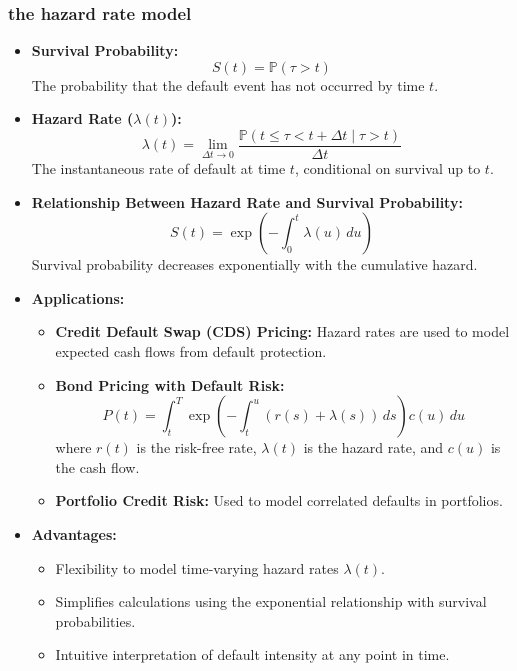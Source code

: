 \documentclass[a4paper,11pt]{book}
\theoremstyle{definition}
\theoremstyle{remark}
\begin{document}
\subsubsection{the hazard rate model}
\begin{itemize}
    \item \textbf{Survival Probability:}
    \[
    S(t) = \mathbb{P}(\tau > t)
    \]
    The probability that the default event has not occurred by time \(t\).

    \item \textbf{Hazard Rate (\(\lambda(t)\)):}
    \[
    \lambda(t) = \lim_{\Delta t \to 0} \frac{\mathbb{P}(t \leq \tau < t + \Delta t \mid \tau > t)}{\Delta t}
    \]
    The instantaneous rate of default at time \(t\), conditional on survival up to \(t\).

    \item \textbf{Relationship Between Hazard Rate and Survival Probability:}
    \[
    S(t) = \exp\left(-\int_0^t \lambda(u) \, du\right)
    \]
    Survival probability decreases exponentially with the cumulative hazard.

    \item \textbf{Applications:}
    \begin{itemize}
        \item \textbf{Credit Default Swap (CDS) Pricing:} Hazard rates are used to model expected cash flows from default protection.
        \item \textbf{Bond Pricing with Default Risk:}
        \[
        P(t) = \int_t^T \exp\left(-\int_t^u (r(s) + \lambda(s)) \, ds\right) c(u) \, du
        \]
        where \(r(t)\) is the risk-free rate, \(\lambda(t)\) is the hazard rate, and \(c(u)\) is the cash flow.
        \item \textbf{Portfolio Credit Risk:} Used to model correlated defaults in portfolios.
    \end{itemize}

    \item \textbf{Advantages:}
    \begin{itemize}
        \item Flexibility to model time-varying hazard rates \(\lambda(t)\).
        \item Simplifies calculations using the exponential relationship with survival probabilities.
        \item Intuitive interpretation of default intensity at any point in time.
    \end{itemize}


\end{itemize}
\end{document}
